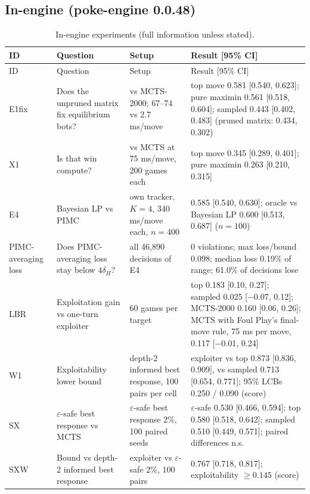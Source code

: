 \documentclass[10pt]{article}
\theoremstyle{plain}
\theoremstyle{definition}
\theoremstyle{remark}
\newcommand{\dH}{\delta_H}
\begin{document}
\subsection{In-engine (poke-engine 0.0.48)}\label{sec:engine}

\begingroup\footnotesize\setlength{\tabcolsep}{3pt}
\begin{longtable}{@{}p{1.3cm}p{3.6cm}p{4.2cm}p{7.0cm}@{}}
\caption{In-engine experiments (full information unless stated).}\label{tab:engine}\\
\toprule ID & Question & Setup & Result [95\% CI] \\ \midrule \endfirsthead
\toprule ID & Question & Setup & Result [95\% CI] \\ \midrule \endhead
E1fix & Does the unpruned matrix fix equilibrium bots? & vs MCTS-2000; 67--74 vs 2.7 ms/move & top move 0.581 [0.540, 0.623]; pure maximin 0.561 [0.518, 0.604]; sampled 0.443 [0.402, 0.483] (pruned matrix: 0.434, 0.302) \\
X1 & Is that win compute? & vs MCTS at 75 ms/move, 200 games each & top move 0.345 [0.289, 0.401]; pure maximin 0.263 [0.210, 0.315] \\
E4 & Bayesian LP vs PIMC & own tracker, $K=4$, 340 ms/move each, $n=400$ & 0.585 [0.540, 0.630]; oracle vs Bayesian LP 0.600 [0.513, 0.687] ($n=100$) \\
PIMC-averaging loss & Does PIMC-averaging loss stay below $4\dH$? & all 46,890 decisions of E4 & 0 violations; max loss/bound 0.098; median loss 0.19\% of range; 61.0\% of decisions lose \\
LBR & Exploitation gain vs one-turn exploiter & 60 games per target & top 0.183 [0.10, 0.27]; sampled 0.025 [$-$0.07, 0.12]; MCTS-2000 0.160 [0.06, 0.26]; MCTS with Foul Play's final-move rule, 75 ms per move, 0.117 [$-$0.01, 0.24] \\
W1 & Exploitability lower bound & depth-2 informed best response, 100 pairs per cell & exploiter vs top 0.873 [0.836, 0.909], vs sampled 0.713 [0.654, 0.771]; 95\% LCBs 0.250 / 0.090 (score) \\
SX & $\varepsilon$-safe best response vs MCTS & $\varepsilon$-safe best response 2\%, 100 paired seeds & $\varepsilon$-safe 0.530 [0.466, 0.594]; top 0.580 [0.518, 0.642]; sampled 0.510 [0.449, 0.571]; paired differences n.s. \\
SXW & Bound vs depth-2 informed best response & exploiter vs $\varepsilon$-safe 2\%, 100 pairs & 0.767 [0.718, 0.817]; exploitability $\ge0.145$ (score) \\

\end{longtable}
\end{document}
